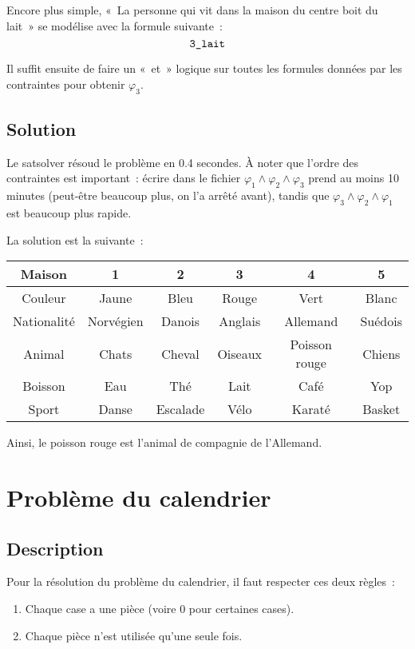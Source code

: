 Encore plus simple, «~La personne qui vit dans la maison du centre boit du
lait~» se modélise avec la formule suivante~:
\begin{equation*}
    \verb|3_lait|
\end{equation*}

Il suffit ensuite de faire un «~et~» logique sur toutes les formules données
par les contraintes pour obtenir $\varphi_3$.

\subsection{Solution}
Le satsolver résoud le problème en 0.4 secondes. À noter que l’ordre des
contraintes est important~: écrire dans le fichier
$\varphi_1 \wedge \varphi_2 \wedge \varphi_3$ prend au moins 10 minutes
(peut-être beaucoup plus, on l’a arrêté avant), tandis que
$\varphi_3 \wedge \varphi_2 \wedge \varphi_1$ est beaucoup plus rapide.

La solution est la suivante~:
\begin{center}
\begin{tabular}{|c|c|c|c|c|c|}
    \hline
    Maison      & 1         & 2         & 3       & 4             & 5 \\
    \hline
    Couleur     & Jaune     & Bleu      & Rouge   & Vert          & Blanc \\
    \hline
    Nationalité & Norvégien & Danois    & Anglais & Allemand      & Suédois \\
    \hline
    Animal      & Chats     & Cheval    & Oiseaux & Poisson rouge & Chiens \\
    \hline
    Boisson     & Eau       & Thé       & Lait    & Café          & Yop \\
    \hline
    Sport       & Danse     & Escalade  & Vélo    & Karaté        & Basket \\
    \hline
\end{tabular}
\end{center}

Ainsi, le poisson rouge est l’animal de compagnie de l’Allemand.


\section{Problème du calendrier}
\subsection*{Description}
Pour la résolution du problème du calendrier, il faut respecter ces deux
règles~:
\begin{enumerate}
    \item Chaque case a une pièce (voire 0 pour certaines cases).
    \item Chaque pièce n'est utilisée qu'une seule fois.
\end{enumerate}

